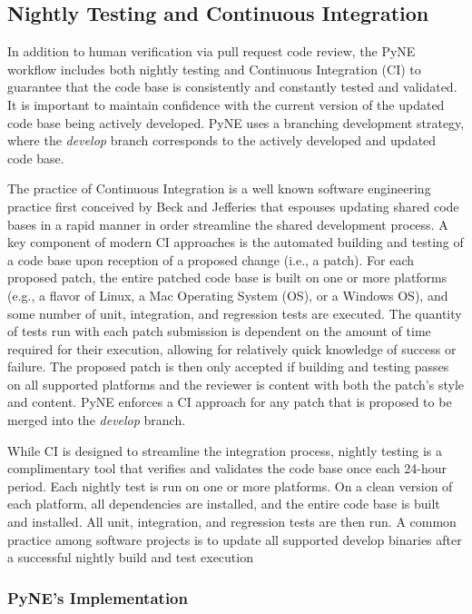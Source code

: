 \documentclass{anstrans}
\begin{document}

\subsection{Nightly Testing and Continuous Integration} 

In addition to human verification via pull request code review, the PyNE
workflow includes both nightly testing and Continuous Integration (CI) to
guarantee that the code base is consistently and constantly tested and
validated. It is important to maintain confidence with the current version of
the updated code base being actively developed. PyNE uses a branching
development strategy, where the \textit{develop} branch corresponds to the
actively developed and updated code base.

The practice of Continuous Integration is a well known software engineering
practice first conceived by Beck and Jefferies \cite{beck1998extreme} that
espouses updating shared code bases in a rapid manner in order streamline the
shared development process. A key component of modern CI approaches is the
automated building and testing of a code base upon reception of a proposed
change (i.e., a patch). For each proposed patch, the entire patched code base is
built on one or more platforms (e.g., a flavor of Linux, a Mac Operating System
(OS), or a Windows OS), and some number of unit, integration, and regression
tests are executed. The quantity of tests run with each patch submission is
dependent on the amount of time required for their execution, allowing for
relatively quick knowledge of success or failure. The proposed patch is then only
accepted if building and testing passes on all supported platforms and the
reviewer is content with both the patch's style and content. PyNE enforces a CI
approach for any patch that is proposed to be merged into the \textit{develop}
branch.

While CI is designed to streamline the integration process, nightly testing is a
complimentary tool that verifies and validates the code base once each 24-hour
period. Each nightly test is run on one or more platforms. On a clean version of
each platform, all dependencies are installed, and the entire code base is built
and installed. All unit, integration, and regression tests are then run. A
common practice among software projects is to update all supported develop
binaries after a successful nightly build and test execution

\subsubsection{PyNE's Implementation}
\end{document}

